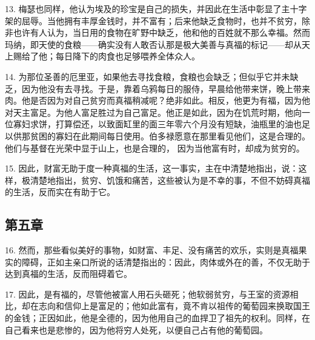 13. 梅瑟也同样，他认为埃及的珍宝是自己的损失，并因此在生活中彰显了主十字架的屈辱。当他拥有丰厚金钱时，并不富有；后来他缺乏食物时，也并不贫穷，除非也许有人认为，当日用的食物在旷野中缺乏，他和他的百姓就不那么幸福。然而玛纳，即天使的食粮——确实没有人敢否认那是极大美善与真福的标记——却从天上赐给了他；每日降下的肉食也足够喂养全体众人。\par

14. 为那位圣善的厄里亚，如果他去寻找食粮，食粮也会缺乏；但似乎它并未缺乏，因为他没有去寻找。于是，靠着乌鸦每日的服侍，早晨给他带来饼，晚上带来肉。他是否因为对自己贫穷而真福稍减呢？绝非如此。相反，他更为有福，因为他对天主富足。为他人富足胜过为自己富足。他正是如此，因为在饥荒时期，他向一位寡妇求饼，打算偿还，以致面缸里的面三年零六个月没有短缺，油瓶里的油也足以供那贫困的寡妇在此期间每日使用。伯多禄愿意在那里看见他们，这是合理的。他们与基督在光荣中显于山上，也是合理的， 因为当他富有时，却成为贫穷的。\par

15. 因此，财富无助于度一种真福的生活，这一事实，主在中清楚地指出，说：这样，极清楚地指出，贫穷、饥饿和痛苦，这些被认为是不幸的事，不但不妨碍真福的生活，反而实在有助于它。\par


\subsection{第五章}

\par

16. 然而，那些看似美好的事物，如财富、丰足、没有痛苦的欢乐，实则是真福果实的障碍，正如主亲口所说的话清楚指出的：因此，肉体或外在的善，不仅无助于达到真福的生活，反而阻碍着它。\par

17. 因此，是有福的，尽管他被富人用石头砸死；他软弱贫穷，与王室的资源相比，却在志向和信仰上是富足的；他如此富有，竟不肯以祖传的葡萄园来换取国王的金钱；正因如此，他是全德的，因为他用自己的血捍卫了祖先的权利。同样，在自己看来也是悲惨的，因为他将穷人处死，以便自己占有他的葡萄园。\par


